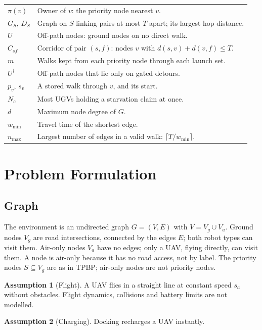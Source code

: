 \documentclass[11pt]{article}
\theoremstyle{definition}
\newtheorem{assumption}{Assumption}
\theoremstyle{plain}
\begin{document}
\begin{table}[H]
\begin{tabularx}{\linewidth}{lX}
$\pi(v)$ & Owner of $v$: the priority node nearest $v$. \\
$G_S$, $D_S$ & Graph on $S$ linking pairs at most $T$ apart; its largest hop distance. \\
$U$ & Off-path nodes: ground nodes on no direct walk. \\
$C_{sf}$ & Corridor of pair $(s, f)$: nodes $v$ with $d(s,v) + d(v,f) \leq T$. \\
$m$ & Walks kept from each priority node through each launch set. \\
$U^\dagger$ & Off-path nodes that lie only on gated detours. \\
$p_v$, $s_v$ & A stored walk through $v$, and its start. \\
$N_c$ & Most UGVs holding a starvation claim at once. \\
$d$ & Maximum node degree of $G$. \\
$w_{\min}$ & Travel time of the shortest edge. \\
$n_{\max}$ & Largest number of edges in a valid walk: $\lceil T / w_{\min} \rceil$. \\
\bottomrule
\end{tabularx}
\end{table}

\section{Problem Formulation}

\subsection{Graph}

The environment is an undirected graph $G = (V, E)$ with $V = V_g \cup
V_a$. Ground nodes $V_g$ are road intersections, connected by the edges
$E$; both robot types can visit them. Air-only nodes $V_a$ have no edges;
only a UAV, flying directly, can visit them. A node is air-only because it
has no road access, not by label. The priority nodes $S \subseteq V_g$ are
as in TPBP; air-only nodes are not priority nodes.

\begin{assumption}[Flight]
A UAV flies in a straight line at constant speed $s_a$ without obstacles.
Flight dynamics, collisions and battery limits are not modelled.
\end{assumption}

\begin{assumption}[Charging]
Docking recharges a UAV instantly.
\end{assumption}
\end{document}

